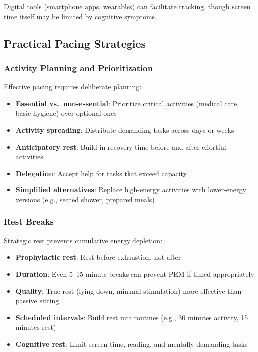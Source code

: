 Digital tools (smartphone apps, wearables) can facilitate tracking, though screen time itself may be limited by cognitive symptoms.

\subsection{Practical Pacing Strategies}

\subsubsection{Activity Planning and Prioritization}

Effective pacing requires deliberate planning:

\begin{itemize}
    \item \textbf{Essential vs.\ non-essential}: Prioritize critical activities (medical care, basic hygiene) over optional ones
    \item \textbf{Activity spreading}: Distribute demanding tasks across days or weeks
    \item \textbf{Anticipatory rest}: Build in recovery time before and after effortful activities
    \item \textbf{Delegation}: Accept help for tasks that exceed capacity
    \item \textbf{Simplified alternatives}: Replace high-energy activities with lower-energy versions (e.g., seated shower, prepared meals)
\end{itemize}

\subsubsection{Rest Breaks}

Strategic rest prevents cumulative energy depletion:

\begin{itemize}
    \item \textbf{Prophylactic rest}: Rest before exhaustion, not after
    \item \textbf{Duration}: Even 5--15 minute breaks can prevent PEM if timed appropriately
    \item \textbf{Quality}: True rest (lying down, minimal stimulation) more effective than passive sitting
    \item \textbf{Scheduled intervals}: Build rest into routines (e.g., 30 minutes activity, 15 minutes rest)
    \item \textbf{Cognitive rest}: Limit screen time, reading, and mentally demanding tasks
\end{itemize}

